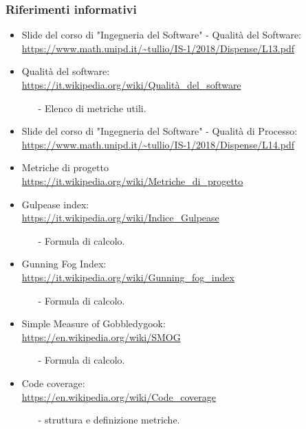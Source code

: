 \subsubsection{Riferimenti informativi}
 \begin{itemize}
 	\item Slide del corso di "Ingegneria del Software" - Qualità del Software: \\
		\url{https://www.math.unipd.it/~tullio/IS-1/2018/Dispense/L13.pdf} 
	\item Qualità del software: \\
		\url{https://it.wikipedia.org/wiki/Qualità_del_software}
		\begin{itemize}
			\item[-] Elenco di metriche utili.
		\end{itemize} 
	\item  Slide del corso di "Ingegneria del Software" - Qualità di Processo: \\
		\url{https://www.math.unipd.it/~tullio/IS-1/2018/Dispense/L14.pdf}
	\item Metriche di progetto \\
 		\url{https://it.wikipedia.org/wiki/Metriche_di_progetto}
 	\item Gulpease index: \\
 		\url{https://it.wikipedia.org/wiki/Indice_Gulpease}
 	\begin{itemize}
 		\item[-] Formula di calcolo.
	\end{itemize}
	\item Gunning Fog Index: \\
		\url{https://it.wikipedia.org/wiki/Gunning_fog_index}
		\begin{itemize}
		\item[-] Formula di calcolo.
		\end{itemize}
	\clearpage
	\item Simple Measure of Gobbledygook: \\  
		 \url{https://en.wikipedia.org/wiki/SMOG}
		 \begin{itemize}
		 	\item[-] Formula di calcolo.
		 \end{itemize}
	\item Code coverage: \\ 
		\url{https://en.wikipedia.org/wiki/Code_coverage}
		\begin{itemize}
		\item[-] struttura e definizione metriche.
		\end{itemize}
\end{itemize}
